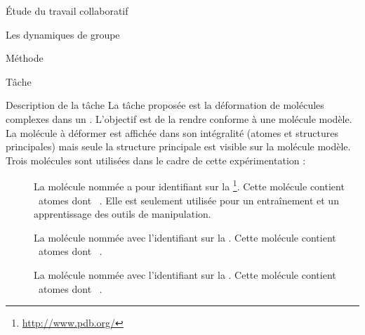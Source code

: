 \documentclass[myfrancais]{mythesis}
\begin{document}
\begin{mypart}{Étude du travail collaboratif}
\begin{mychapter}{Les dynamiques de groupe}
\begin{mysection}{Méthode}
\begin{mysubsection}{Tâche}
\begin{mysubsubsection}{Description de la tâche}
						La tâche proposée est la déformation de molécules complexes dans un .
						L'objectif est de la rendre conforme à une molécule modèle.
						La molécule à déformer est affichée dans son intégralité (atomes et structures principales) mais seule la structure principale est visible sur la molécule modèle.
						Trois molécules sont utilisées dans le cadre de cette expérimentation :
						\begin{description}
							\item[\myTRPCAGE]
								La molécule nommée \myTRPCAGE {} a pour identifiant \myPDB {} sur la \myPDBbase\footnote{\url{http://www.pdb.org/}}.
								Cette molécule contient ~atomes dont ~.
								Elle est seulement utilisée pour un entraînement et un apprentissage des outils de manipulation.
							\item[\myPrion]
								La molécule nommée \myPrion {} avec l'identifiant \myPDB {} sur la \myPDBbase\footnotemark[\value{footnote}].
								Cette molécule contient ~atomes dont ~.
							\item[\myUbiquitin]
								La molécule nommée \myUbiquitin {} avec l'identifiant \myPDB {} sur la \myPDBbase\footnotemark[\value{footnote}].
								Cette molécule contient ~atomes dont ~.
						\end{description}


\end{mysubsubsection}
\end{mysubsection}
\end{mysection}
\end{mychapter}
\end{mypart}
\end{document}
